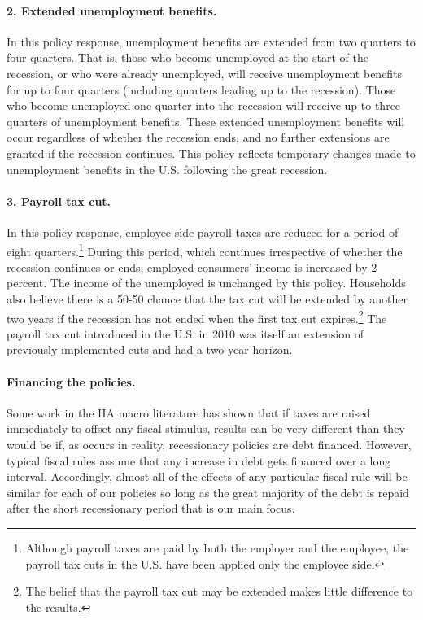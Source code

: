 \documentclass[\econtexRoot/HAFiscal]{subfiles}
\begin{document}
\paragraph{2.
Extended unemployment benefits.} In this policy response, unemployment benefits are extended from two quarters to four quarters.
That is, those who become unemployed at the start of the recession, or who were already unemployed, will receive unemployment benefits for up to four quarters (including quarters leading up to the recession).
Those who become unemployed one quarter into the recession will receive up to three quarters of unemployment benefits.
These extended unemployment benefits will occur regardless of whether the recession ends, and no further extensions are granted if the recession continues.
This policy reflects temporary changes made to unemployment benefits in the U.S.
following the great recession.

\paragraph{3.
Payroll tax cut.} In this policy response, employee-side payroll taxes are reduced for a period of eight quarters.\footnote{Although payroll taxes are paid by both the employer and the employee, the payroll tax cuts in the U.S.
have been applied only the employee side.} During this period, which continues irrespective of whether the recession continues or ends, employed consumers' income is increased by 2 percent.
The income of the unemployed is unchanged by this policy.
Households also believe there is a 50-50 chance that the tax cut will be extended by another two years if the recession has not ended when the first tax cut expires.\footnote{The belief that the payroll tax cut may be extended makes little difference to the results.} The payroll tax cut introduced in the U.S.
in 2010 was itself an extension of previously implemented cuts and had a two-year horizon.

\paragraph{Financing the policies.} Some work in the HA macro literature has shown that if taxes are raised immediately to offset any fiscal stimulus, results can be very different than they would be if, as occurs in reality, recessionary policies are debt financed.
However, typical fiscal rules assume that any increase in debt gets financed over a long interval.
Accordingly, almost all of the effects of any particular fiscal rule will be  similar for each of our policies so long as the great majority of the debt is repaid after the short recessionary period that is our main focus.
\end{document}
